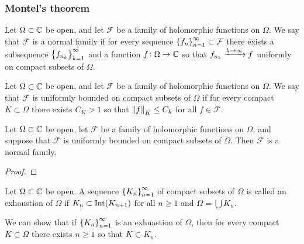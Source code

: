 \documentclass[11pt,a4paper]{article}
\begin{document}

\subsubsection{Montel's theorem}

\begin{definition}
  Let $\Omega \subset \mathbb{C}$ be open,
  and let $\mathcal F$ be a family of holomorphic functions on $\Omega$.
  We say that $\mathcal F$ is a normal family if for every sequence
  $\left\{f_n\right\}_{n=1}^{\infty} \subset \mathcal F$ there exists a subsequence
  $\left\{f_{n_k}\right\}_{k=1}^{\infty}$ and a function $f \colon \Omega \to \mathbb{C}$ so that
  $f_{n_k} \xrightarrow{k \to \infty} f$ uniformly on compact subsets of $\Omega$.
\end{definition}

\begin{definition}
  Let $\Omega \subset \mathbb{C}$ be open,
  and let $\mathcal F$ be a family of holomorphic functions on $\Omega$.
  We say that $\mathcal F$ is uniformly bounded on compact subsets of $\Omega$
  if for every compact $K \subset \Omega$ there exists $C_K > 1$ so that
  $\left\lVert f\right\rVert_{K} \le C_k$ for all $f \in \mathcal F$.
\end{definition}

\begin{theorem}
  Let $\Omega \subset \mathbb{C}$ be open,
  let $\mathcal F$ be a family of holomorphic functions on $\Omega$,
  and suppose that $\mathcal F$ is
  uniformly bounded on compact subsets of $\Omega$.
  Then $\mathcal F$ is a normal family.
\end{theorem}
\begin{proof}

\end{proof}


\begin{definition}[Exhuastion]
  Let $\Omega \subset \mathbb{C}$ be open.
  A sequence $\left\{K_n\right\}_{n=1}^{\infty}$ of compact subsets of $\Omega$ is called
  an exhaustion of $\Omega$ if $K_n \subset \operatorname{Int}(K_{n+1})$ for all $n \geq 1$
  and $\Omega = \bigcup K_n$.
\end{definition}
\begin{remark}
  We can show that if $\left\{K_n\right\}_{n=1}^{\infty}$ is an exhuastion of $\Omega$,
  then for every compact $K \subset \Omega$ there exists $n \geq 1$ so that
  $K \subset K_n$.
\end{remark}
\end{document}
